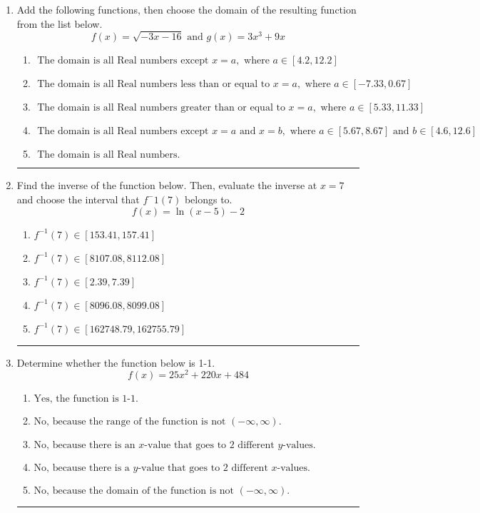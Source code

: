 \documentclass[14pt]{extbook}
\newcommand{\litem}[1]{\item#1\hspace*{-1cm}\rule{\textwidth}{0.4pt}}
\begin{document}
\begin{enumerate}
{\begin{enumerate}[label=\Alph*.]
\end{enumerate} }
\litem{
Add the following functions, then choose the domain of the resulting function from the list below.\[ f(x) = \sqrt{-3x-16}  \text{ and } g(x) = 3x^{3} +9 x \]\begin{enumerate}[label=\Alph*.]
\item \( \text{ The domain is all Real numbers except } x = a, \text{ where } a \in [4.2, 12.2] \)
\item \( \text{ The domain is all Real numbers less than or equal to } x = a, \text{ where } a \in [-7.33, 0.67] \)
\item \( \text{ The domain is all Real numbers greater than or equal to } x = a, \text{ where } a \in [5.33, 11.33] \)
\item \( \text{ The domain is all Real numbers except } x = a \text{ and } x = b, \text{ where } a \in [5.67, 8.67] \text{ and } b \in [4.6, 12.6] \)
\item \( \text{ The domain is all Real numbers. } \)

\end{enumerate} }
\litem{
Find the inverse of the function below. Then, evaluate the inverse at $x = 7$ and choose the interval that $f^-1(7)$ belongs to.\[ f(x) = \ln{(x-5)}-2 \]\begin{enumerate}[label=\Alph*.]
\item \( f^{-1}(7) \in [153.41, 157.41] \)
\item \( f^{-1}(7) \in [8107.08, 8112.08] \)
\item \( f^{-1}(7) \in [2.39, 7.39] \)
\item \( f^{-1}(7) \in [8096.08, 8099.08] \)
\item \( f^{-1}(7) \in [162748.79, 162755.79] \)

\end{enumerate} }
\litem{
Determine whether the function below is 1-1.\[ f(x) = 25 x^2 + 220 x + 484 \]\begin{enumerate}[label=\Alph*.]
\item \( \text{Yes, the function is 1-1.} \)
\item \( \text{No, because the range of the function is not $(-\infty, \infty)$.} \)
\item \( \text{No, because there is an $x$-value that goes to 2 different $y$-values.} \)
\item \( \text{No, because there is a $y$-value that goes to 2 different $x$-values.} \)
\item \( \text{No, because the domain of the function is not $(-\infty, \infty)$.} \)


\end{enumerate}}
\end{enumerate}
\end{document}
